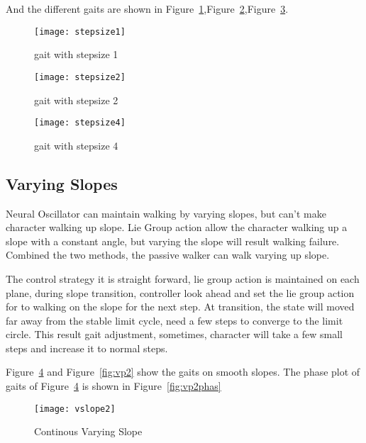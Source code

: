 And the different gaits are shown in Figure~\ref{fig:ssp1},Figure~\ref{fig:ssp2},Figure~\ref{fig:ssp3}.
\begin{figure}[!htbp]
  \begin{center}
      \texttt{[image: stepsize1]}
    \caption{gait with stepsize 1}
    \label{fig:ssp1}
\end{center}
\end{figure}

\begin{figure}[!htbp]
  \begin{center}
      \texttt{[image: stepsize2]}
    \caption{gait with stepsize 2}
    \label{fig:ssp2}
\end{center}
\end{figure}

\begin{figure}[!htbp]
  \begin{center}
      \texttt{[image: stepsize4]}
    \caption{gait with stepsize 4}
    \label{fig:ssp3}
\end{center}
\end{figure}







\subsection{Varying Slopes}
Neural Oscillator can maintain walking by varying slopes, but can't make character walking up slope.
Lie Group action allow the character walking up a slope with a constant angle, but varying the slope will result walking failure.
Combined the two methods, the passive walker can walk varying up slope.


The control strategy it is straight forward, lie group action is maintained on each plane, during slope transition, controller look ahead and set the lie group action for to walking on the slope for the next step.
At transition, the state will moved far away from the stable limit cycle, need a few steps to converge to the limit circle.
This result gait adjustment, sometimes, character will take a few small steps and increase it to normal steps.


Figure~\ref{fig:vp1} and Figure~\ref{fig:vp2} show the gaits on smooth slopes.
The phase plot of gaits of Figure~\ref{fig:vp1} is shown in Figure~\ref{fig:vp2phas} 

\begin{figure}[!htbp]
  \begin{center}
      \texttt{[image: vslope2]}
    \caption{Continous Varying Slope}
    \label{fig:vp1}
\end{center}
\end{figure}


